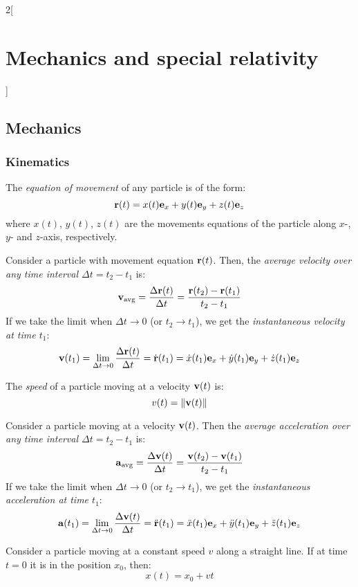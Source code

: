 \documentclass[../../../main.tex]{subfiles}
\begin{document}
\begin{multicols}{2}[\section{Mechanics and special relativity}]
  \subsection{Mechanics}
  \subsubsection{Kinematics}
  \begin{definition}
    The \textit{equation of movement} of any particle is of the form:
    $$\boldsymbol{\mathrm{r}}(t)=x(t)\boldsymbol{\mathrm{e}}_x+y(t)\boldsymbol{\mathrm{e}}_y+z(t)\boldsymbol{\mathrm{e}}_z$$ where $x(t)$, $y(t)$, $z(t)$ are the movements equations of the particle along $x$-, $y$- and $z$-axis, respectively.
  \end{definition}
  \begin{definition}
    Consider a particle with movement equation $\boldsymbol{\mathrm{r}}(t)$. Then, the \textit{average velocity over any time interval $\Delta t=t_2-t_1$} is:
    $$\boldsymbol{\mathrm{v}}_\text{avg}=\frac{\Delta\boldsymbol{\mathrm{r}}(t)}{\Delta t}=\frac{\boldsymbol{\mathrm{r}}(t_2)-\boldsymbol{\mathrm{r}}(t_1)}{t_2-t_1}$$
    If we take the limit when $\Delta t\to0$ (or $t_2\to t_1$), we get the \textit{instantaneous velocity at time $t_1$}: $$\boldsymbol{\mathrm{v}}(t_1)=\lim_{\Delta t\to 0}\frac{\Delta\boldsymbol{\mathrm{r}}(t)}{\Delta t}=\dot{\boldsymbol{\mathrm{r}}}(t_1)=\dot{x}(t_1)\boldsymbol{\mathrm{e}}_x+\dot{y}(t_1)\boldsymbol{\mathrm{e}}_y+\dot{z}(t_1)\boldsymbol{\mathrm{e}}_z$$
  \end{definition}
  \begin{definition}
    The \textit{speed} of a particle moving at a velocity $\boldsymbol{\mathrm{v}}(t)$ is:
    $$v(t)=\|\boldsymbol{\mathrm{v}}(t)\|$$
  \end{definition}
  \begin{definition}
    Consider a particle moving at a velocity $\boldsymbol{\mathrm{v}}(t)$. Then the \textit{average acceleration over any time interval $\Delta t=t_2-t_1$} is:
    $$\boldsymbol{\mathrm{a}}_\text{avg}=\frac{\Delta\boldsymbol{\mathrm{v}}(t)}{\Delta t}=\frac{\boldsymbol{\mathrm{v}}(t_2)-\boldsymbol{\mathrm{v}}(t_1)}{t_2-t_1}$$
    If we take the limit when $\Delta t\to0$ (or $t_2\to t_1$), we get the \textit{instantaneous acceleration at time $t_1$}: $$\boldsymbol{\mathrm{a}}(t_1)=\lim_{\Delta t\to 0}\frac{\Delta\boldsymbol{\mathrm{v}}(t)}{\Delta t}=\ddot{\boldsymbol{\mathrm{r}}}(t_1)=\ddot{x}(t_1)\boldsymbol{\mathrm{e}}_x+\ddot{y}(t_1)\boldsymbol{\mathrm{e}}_y+\ddot{z}(t_1)\boldsymbol{\mathrm{e}}_z$$
  \end{definition}
  \begin{prop}
    Consider a particle moving at a constant speed $v$ along a straight line. If at time $t=0$ it is in the position $x_0$, then: $$x(t)=x_0+vt$$

\end{prop}
\end{multicols}
\end{document}
